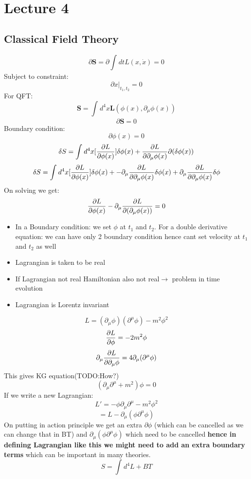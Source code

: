 \documentclass{scrartcl}
\begin{document}
\section{Lecture 4}
\subsection{Classical Field Theory}
\[ \partial \mathbf{S} = \partial \displaystyle\int_{}^{} dt L(x,\dot{x}) = 0\]
Subject to constraint:
\[ \partial x |_{t_1,t_2} = 0 \]
For QFT:
\[ \mathbf{S} = \displaystyle\int_{}^{} d^4 x \mathbf{L}(\phi(x),\partial_\mu \phi(x)) \]
\[ \partial \mathbf{S} = 0 \]
Boundary condition:
\[ \partial \phi(x) = 0 \]
\[ \delta S = \displaystyle\int_{}^{}d^4 x [ \displaystyle\pdv{L}{\phi(x)}] \delta \phi(x) + \displaystyle\pdv{L}{\partial_\mu \phi(x)} \partial(\delta \phi(x)) \]
\[ \delta S = \displaystyle\int_{}^{}d^4 x [ \displaystyle\pdv{L}{\phi(x)}] \delta \phi(x) + - \partial_\mu \displaystyle\pdv{L}{\partial_\mu \phi(x)} \delta \phi(x) + \partial_\mu \displaystyle\pdv{L}{\partial_\mu \phi(x)} \delta \phi\]
On solving we get:
\[ \pdv{L}{\phi(x)} - \partial_\mu \displaystyle\frac{\partial L}{\partial(\partial_\mu \phi(x))} = 0 \]
\begin{itemize}
	\item In a Boundary condition: we set \( \phi \) at $t_1$ and $t_2$. For a double derivative equation: we can have only 2 boundary condition hence cant set velocity at \( t_1 \) and \( t_2  \) as well
	\item Lagrangian is taken to be real
	\item If Lagrangian not real Hamiltonian also not real\( \rightarrow \) problem in time evolution
	\item Lagrangian is Lorentz invariant
\end{itemize}
\[ L = (\partial_\mu \phi)(\partial^\mu \phi) - m^2 \phi^2 \]
\[ \pdv{L}{\phi} = -2m^2 \phi \]
\[ \partial_\mu \pdv{L}{\partial_\mu \phi} = 4 \partial_\mu (\partial^\mu \phi) \]
This gives KG equation(TODO:How?)
\[ (\partial_\mu \partial^\mu + m^2 ) \phi = 0 \]
If we write a new Lagrangian: 
\[ L' = - \phi \partial_\mu \partial^\mu - m^2 \phi^2 \]
\[  = L - \partial_\mu ( \phi \partial^\mu \phi) \]
On putting in action principle we get an extra \( \partial \phi \) (which can be cancelled as we can change that in BT)  and \(   \partial_\mu ( \phi \partial^\mu \phi) \) which need to be cancelled \textbf{hence in defining Lagrangian like this we might need to add an extra boundary terms} which can be important in many theories.
\[ S = \displaystyle\int_{}^{}d^4 L + BT \]
\end{document}
